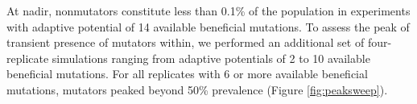 

At nadir, nonmutators constitute less than 0.1\% of the population in experiments with adaptive potential of 14 available beneficial mutations.
To assess the peak of transient presence of mutators within, we performed an additional set of four-replicate simulations ranging from adaptive potentials of 2 to 10 available beneficial mutations.
For all replicates with 6 or more available beneficial mutations, mutators peaked beyond 50\% prevalence (Figure \ref{fig:peaksweep}).
